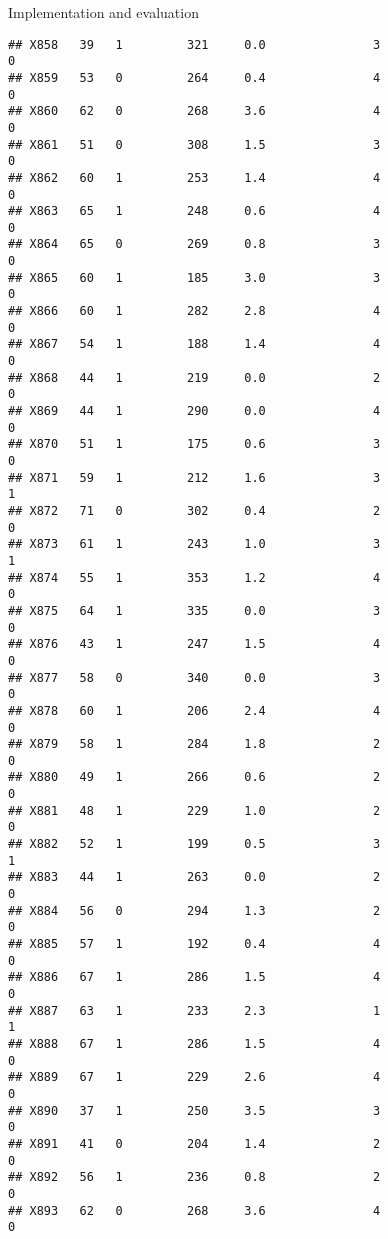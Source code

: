 \documentclass[
  ignorenonframetext,
]{beamer}
\begin{document}
\begin{frame}[fragile]{Implementation and evaluation}
\begin{verbatim}
## X858   39   1         321     0.0               3                   0
## X859   53   0         264     0.4               4                   0
## X860   62   0         268     3.6               4                   0
## X861   51   0         308     1.5               3                   0
## X862   60   1         253     1.4               4                   0
## X863   65   1         248     0.6               4                   0
## X864   65   0         269     0.8               3                   0
## X865   60   1         185     3.0               3                   0
## X866   60   1         282     2.8               4                   0
## X867   54   1         188     1.4               4                   0
## X868   44   1         219     0.0               2                   0
## X869   44   1         290     0.0               4                   0
## X870   51   1         175     0.6               3                   0
## X871   59   1         212     1.6               3                   1
## X872   71   0         302     0.4               2                   0
## X873   61   1         243     1.0               3                   1
## X874   55   1         353     1.2               4                   0
## X875   64   1         335     0.0               3                   0
## X876   43   1         247     1.5               4                   0
## X877   58   0         340     0.0               3                   0
## X878   60   1         206     2.4               4                   0
## X879   58   1         284     1.8               2                   0
## X880   49   1         266     0.6               2                   0
## X881   48   1         229     1.0               2                   0
## X882   52   1         199     0.5               3                   1
## X883   44   1         263     0.0               2                   0
## X884   56   0         294     1.3               2                   0
## X885   57   1         192     0.4               4                   0
## X886   67   1         286     1.5               4                   0
## X887   63   1         233     2.3               1                   1
## X888   67   1         286     1.5               4                   0
## X889   67   1         229     2.6               4                   0
## X890   37   1         250     3.5               3                   0
## X891   41   0         204     1.4               2                   0
## X892   56   1         236     0.8               2                   0
## X893   62   0         268     3.6               4                   0

\end{verbatim}
\end{frame}
\end{document}
